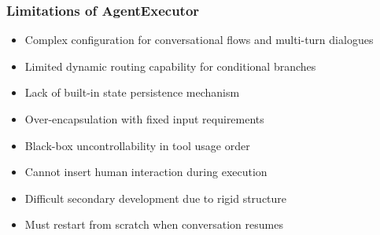 \begin{frame}[fragile]\frametitle{Limitations of AgentExecutor}
      \begin{itemize}
        \item Complex configuration for conversational flows and multi-turn dialogues
        \item Limited dynamic routing capability for conditional branches
        \item Lack of built-in state persistence mechanism
        \item Over-encapsulation with fixed input requirements
        \item Black-box uncontrollability in tool usage order
        \item Cannot insert human interaction during execution
        \item Difficult secondary development due to rigid structure
        \item Must restart from scratch when conversation resumes
      \end{itemize}
\end{frame}









